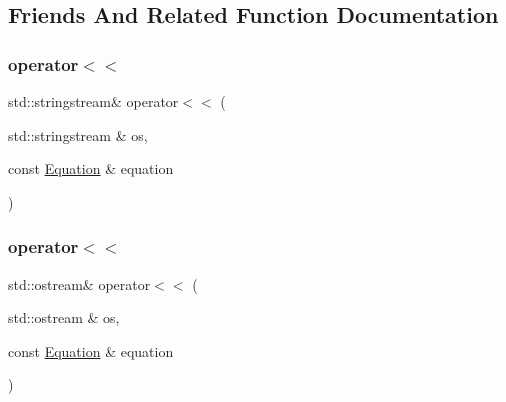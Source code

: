 \subsection{Friends And Related Function Documentation}
\mbox{\label{classteam22_1_1_calc_1_1_equation_a8ee0e20eaa10e114d79e0b16cb11ddcf}} 
\subsubsection{\texorpdfstring{operator$<$$<$}{operator<<}\hspace{0.1cm}{\footnotesize\ttfamily [1/2]}}
{\footnotesize\ttfamily std\+::stringstream\& operator$<$$<$ (\begin{DoxyParamCaption}\item[{std\+::stringstream \&}]{os,  }\item[{const \hyperlink{classteam22_1_1_calc_1_1_equation}{Equation} \&}]{equation }\end{DoxyParamCaption})\hspace{0.3cm}{\ttfamily [friend]}}

\mbox{\label{classteam22_1_1_calc_1_1_equation_aea7df9bdea5430cc309e17f1f2fbe78f}} 
\subsubsection{\texorpdfstring{operator$<$$<$}{operator<<}\hspace{0.1cm}{\footnotesize\ttfamily [2/2]}}
{\footnotesize\ttfamily std\+::ostream\& operator$<$$<$ (\begin{DoxyParamCaption}\item[{std\+::ostream \&}]{os,  }\item[{const \hyperlink{classteam22_1_1_calc_1_1_equation}{Equation} \&}]{equation }\end{DoxyParamCaption})\hspace{0.3cm}{\ttfamily [friend]}}



